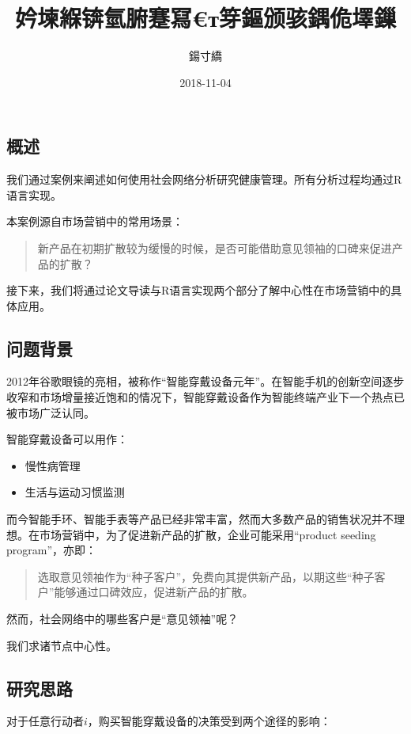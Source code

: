\documentclass[]{article}
\title{妗堜緥锛氫腑蹇冩€т笌鏂颁骇鍝佹墿鏁}
\author{鍚寸繑}
\date{2018-11-04}
\providecommand{\tightlist}{%
  \setlength{\itemsep}{0pt}\setlength{\parskip}{0pt}}
\begin{document}
\maketitle

\subsection{概述}

我们通过案例来阐述如何使用社会网络分析研究健康管理。所有分析过程均通过R语言实现。

本案例源自市场营销中的常用场景：

\begin{quote}
新产品在初期扩散较为缓慢的时候，是否可能借助意见领袖的口碑来促进产品的扩散？
\end{quote}

接下来，我们将通过论文导读与R语言实现两个部分了解中心性在市场营销中的具体应用。

\subsection{问题背景}

2012年谷歌眼镜的亮相，被称作``智能穿戴设备元年''。在智能手机的创新空间逐步收窄和市场增量接近饱和的情况下，智能穿戴设备作为智能终端产业下一个热点已被市场广泛认同。

智能穿戴设备可以用作：

\begin{itemize}
\tightlist
\item
  慢性病管理
\item
  生活与运动习惯监测
\end{itemize}

而今智能手环、智能手表等产品已经非常丰富，然而大多数产品的销售状况并不理想。在市场营销中，为了促进新产品的扩散，企业可能采用``product
seeding program''，亦即：

\begin{quote}
选取意见领袖作为``种子客户''，免费向其提供新产品，以期这些``种子客户''能够通过口碑效应，促进新产品的扩散。
\end{quote}

然而，社会网络中的哪些客户是``意见领袖''呢？

我们求诸节点中心性。

\subsection{研究思路}

对于任意行动者\(i\)，购买智能穿戴设备的决策受到两个途径的影响：
\end{document}

